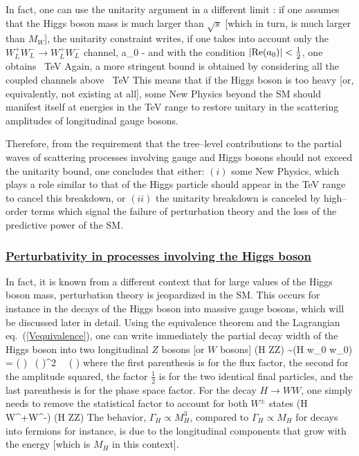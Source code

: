 In fact, one can use the unitarity argument in a different limit
\cite{Equivalence-theorem}: if one assumes that the Higgs  boson mass is much
larger than $\sqrt{s}$ [which in turn, is much  larger than $M_{W}$], the
unitarity constraint writes, if one takes into account only the $W_L^+ W_L^-
\to W_L^+ W_L^-$ channel, 
\beq
a_0  \longrightarrow -  
\eeq
and with the condition $|{\rm Re}(a_0)| < {1 \over 2}$, one obtains
\beq
{}  ~{\rm TeV}  
\eeq
Again, a more stringent bound  is obtained by considering all the coupled 
channels above
\beq
{} ~{\rm TeV}
\eeq
This means that if the Higgs boson is too heavy [or, equivalently, not existing
at all], some New Physics beyond the SM should manifest itself at energies in 
the TeV range to restore unitary in the scattering  amplitudes of longitudinal 
gauge bosons.\s

Therefore, from the requirement that the tree--level contributions to the
partial waves of scattering processes involving gauge and Higgs bosons should 
not exceed the unitarity bound, one concludes that either: $(i)$ some New 
Physics, which plays a role similar to that of the Higgs particle should appear
in the TeV range to cancel this breakdown, or $(ii)$ the unitarity breakdown is
canceled by high--order terms which signal the failure of perturbation theory 
and the loss of the predictive power of the SM. 


\subsubsection*{\underline{Perturbativity in processes involving the Higgs 
boson}}

In fact, it is known from a different context that for large values of the Higgs
boson mass, perturbation theory is jeopardized in the SM. This occurs for
instance in the decays of the Higgs boson into massive gauge bosons, which
will be discussed later in detail. Using the equivalence theorem and the
Lagrangian eq.~(\ref{Vequivalence}), one can write immediately the partial
decay width of the Higgs boson into two longitudinal $Z$ bosons [or $W$ bosons]
\beq
\Gamma(H \to ZZ) \sim  \Gamma(H \to w_0 w_0) = \left(  
\right) \ \left(  \right)^2 \, \, 
\left(  \right) \to {} 
\eeq
where the first parenthesis is for the flux factor, the second for the 
amplitude squared, the factor $\frac{1}{2}$ is for the two identical final 
particles, and the last parenthesis is for the phase space factor. For the 
decay $H \to WW$, one simply needs to remove the statistical factor to
account for both $W^\pm$ states
\beq
\Gamma (H \to W^+W^-)   \Gamma (H \to ZZ)
\eeq
The behavior, $\Gamma_H \propto M_H^3$, compared to  $\Gamma_H \propto M_H$ for
decays into fermions for instance, is due to the  longitudinal components that
grow with the energy [which is $M_H$ in this  context].\s

